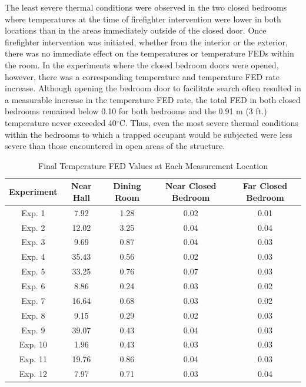 \documentclass[12pt,oneside]{article}
\begin{document}
The least severe thermal conditions were observed in the  two closed bedrooms where temperatures at the time of firefighter intervention were lower in both locations than in the areas immediately outside of the closed door. Once firefighter intervention was initiated, whether from the interior or the exterior, there was no immediate effect on the temperatures or temperature FEDs within the room. In the experiments where the closed bedroom doors were opened, however, there was a corresponding temperature and temperature FED rate increase. Although opening the bedroom door to facilitate search often resulted in a measurable increase in the temperature FED rate, the total FED in both closed bedrooms remained below 0.10 for both bedrooms and the 0.91 m (3 ft.) temperature never exceeded 40$^{\circ}$C. Thus, even the most severe thermal conditions within the bedrooms to which a trapped occupant would be subjected were less severe than those encountered in open areas of the structure. 

\begin{table}[!ht]
    \centering
    \caption{Final Temperature FED Values at Each Measurement Location}
    \label{tab:temp_fed}
    \begin{tabular}{ccccc}
    \toprule[1.5pt]
	\textbf{Experiment}  &   \textbf{Near Hall}& \textbf{Dining Room}& \textbf{Near Closed Bedroom}& \textbf{Far Closed Bedroom} \\ 
	\midrule                                                                   
	Exp. 1 &7.92        & 1.28        		& 0.02     & 0.01        \\  
	Exp. 2 &12.02       & 3.25       		& 0.04     & 0.04        \\
	Exp. 3 & 9.69    	& 0.87        		& 0.04     & 0.03        \\               
	Exp. 4 & 35.43      & 0.56         		& 0.02     & 0.03        \\                
	Exp. 5 & 33.25      & 0.76          	& 0.07     & 0.03        \\                 
	Exp. 6 & 8.86       & 0.24         		& 0.03     & 0.02        \\                 
	Exp. 7 & 16.64      & 0.68         		& 0.03     & 0.02        \\                
	Exp. 8 & 9.15       & 0.29         		& 0.02     & 0.03        \\            
	Exp. 9 & 39.07      & 0.43          	& 0.04     & 0.03        \\              
	Exp. 10& 1.96       & 0.43          	& 0.03     & 0.03        \\         
	Exp. 11& 19.76      & 0.86           	& 0.04     & 0.03        \\             
	Exp. 12& 7.97       & 0.71          	& 0.03     & 0.04        \\           
	\bottomrule[1.25pt] 

    \end{tabular}
\end{table}                   
\end{document}
